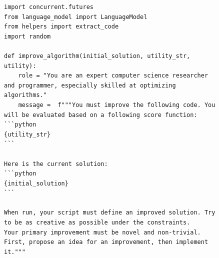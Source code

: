 \documentclass{article}
\begin{document}
\begin{figure}[h]

  \centering 
\vspace{-12pt}
\begin{mybox}
\begin{lstlisting}[style=mystyle]
import concurrent.futures
from language_model import LanguageModel
from helpers import extract_code
import random

def improve_algorithm(initial_solution, utility_str, utility):
    role = "You are an expert computer science researcher and programmer, especially skilled at optimizing algorithms."
    message =  f"""You must improve the following code. You will be evaluated based on a following score function:
```python
{utility_str}
```

Here is the current solution:
```python
{initial_solution}
```

When run, your script must define an improved solution. Try to be as creative as possible under the constraints.
Your primary improvement must be novel and non-trivial. First, propose an idea for an improvement, then implement it."""


\end{lstlisting}
\end{mybox}
\end{figure}
\end{document}
